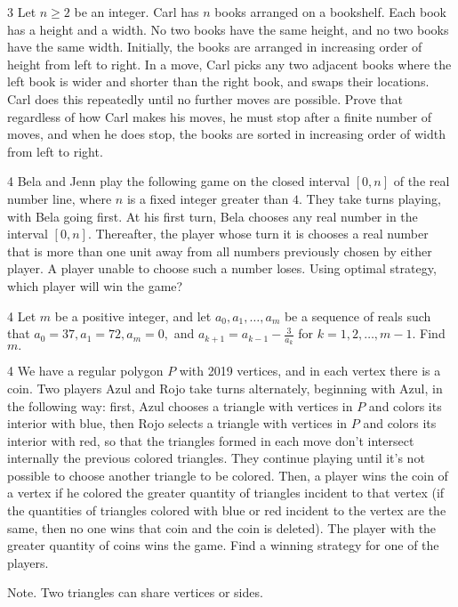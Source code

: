 \documentclass[mast]{lucky}
\begin{document}
\begin{prob}[USAJMO 2020/1]{3}
Let $n \geq 2$ be an integer. Carl has $n$ books arranged on a bookshelf. Each book has a height and a width. No two books have the same height, and no two books have the same width. Initially, the books are arranged in increasing order of height from left to right. In a move, Carl picks any two adjacent books where the left book is wider and shorter than the right book, and swaps their locations. Carl does this repeatedly until no further moves are possible. Prove that regardless of how Carl makes his moves, he must stop after a finite number of moves, and when he does stop, the books are sorted in increasing order of width from left to right.
\end{prob}

\begin{prob}[AMC 10B 2020/16]{4}
Bela and Jenn play the following game on the closed interval $[0, n]$ of the real number line, where $n$ is a fixed integer greater than $4$. They take turns playing, with Bela going first. At his first turn, Bela chooses any real number in the interval $[0, n]$. Thereafter, the player whose turn it is chooses a real number that is more than one unit away from all numbers previously chosen by either player. A player unable to choose such a number loses. Using optimal strategy, which player will win the game?
\end{prob}

\begin{prob}[AIME II 2005/11]{4}
Let $m$ be a positive integer, and let $a_0, a_1,\ldots,a_m$ be a sequence of reals such that $a_0 = 37, a_1 = 72, a_m = 0,$ and $a_{k+1} = a_{k-1} - \frac 3{a_k}$ for $k = 1,2,\ldots, m-1.$ Find $m.$
\end{prob}

\begin{req}[OMCC 2019/2]{4}
We have a regular polygon $P$ with 2019 vertices, and in each vertex there is a coin. Two players Azul and Rojo take turns alternately, beginning with Azul, in the following way: first, Azul chooses a triangle with vertices in $P$ and colors its interior with blue, then Rojo selects a triangle with vertices in $P$ and colors its interior with red, so that the triangles formed in each move don't intersect internally the previous colored triangles. They continue playing until it's not possible to choose another triangle to be colored. Then, a player wins the coin of a vertex if he colored the greater quantity of triangles incident to that vertex (if the quantities of triangles colored with blue or red incident to the vertex are the same, then no one wins that coin and the coin is deleted). The player with the greater quantity of coins wins the game. Find a winning strategy for one of the players.

Note. Two triangles can share vertices or sides.
\end{req}
\end{document}
